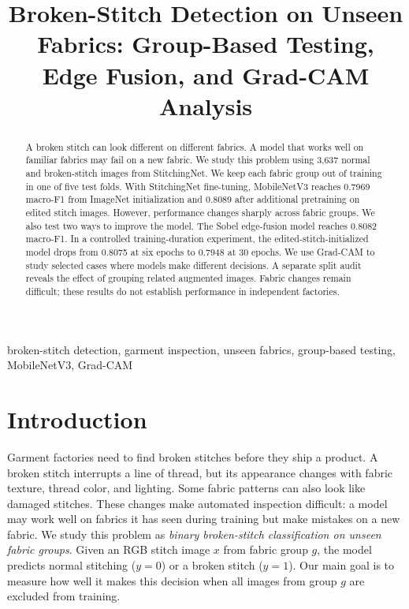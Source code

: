\documentclass[conference,a4paper]{IEEEtran}
\begin{document}
\title{Broken-Stitch Detection on Unseen Fabrics: Group-Based Testing, Edge Fusion, and Grad-CAM Analysis}
\author{}
\maketitle
\begin{abstract}
A broken stitch can look different on different fabrics. A model that works well on familiar fabrics may fail on a new fabric. We study this problem using 3,637 normal and broken-stitch images from StitchingNet. We keep each fabric group out of training in one of five test folds. With StitchingNet fine-tuning, MobileNetV3 reaches 0.7969 macro-F1 from ImageNet initialization and 0.8089 after additional pretraining on edited stitch images. However, performance changes sharply across fabric groups. We also test two ways to improve the model. The Sobel edge-fusion model reaches 0.8082 macro-F1. In a controlled training-duration experiment, the edited-stitch-initialized model drops from 0.8075 at six epochs to 0.7948 at 30 epochs. We use Grad-CAM to study selected cases where models make different decisions. A separate split audit reveals the effect of grouping related augmented images. Fabric changes remain difficult; these results do not establish performance in independent factories.
\end{abstract}
\begin{IEEEkeywords}
broken-stitch detection, garment inspection, unseen fabrics, group-based testing, MobileNetV3, Grad-CAM
\end{IEEEkeywords}

\section{Introduction}
Garment factories need to find broken stitches before they ship a product. A broken stitch interrupts a line of thread, but its appearance changes with fabric texture, thread color, and lighting. Some fabric patterns can also look like damaged stitches. These changes make automated inspection difficult: a model may work well on fabrics it has seen during training but make mistakes on a new fabric. We study this problem as \emph{binary broken-stitch classification on unseen fabric groups}. Given an RGB stitch image $x$ from fabric group $g$, the model predicts normal stitching ($y=0$) or a broken stitch ($y=1$). Our main goal is to measure how well it makes this decision when all images from group $g$ are excluded from training.
\end{document}
